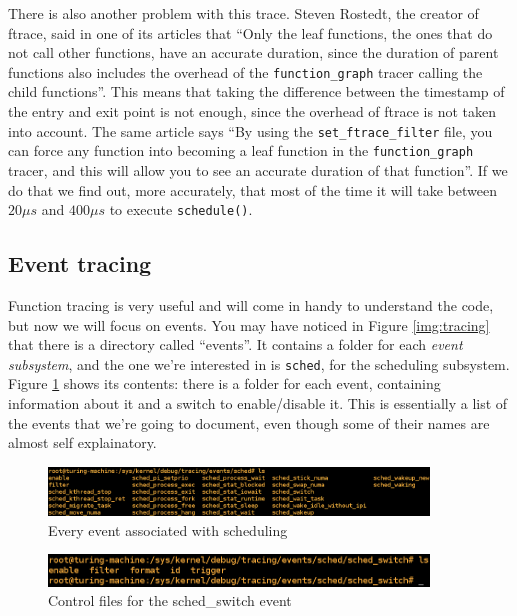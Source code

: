 There is also another problem with this trace. Steven Rostedt, the creator of ftrace, said in one of its articles that ``Only the leaf functions, the ones that do not call other functions, have an accurate duration, since the duration of parent functions also includes the overhead of the \verb|function_graph| tracer calling the child functions''.\cite{secrets} This means that taking the difference between the timestamp of the entry and exit point is not enough, since the overhead of ftrace is not taken into account. The same article says ``By using the \verb|set_ftrace_filter| file, you can force any function into becoming a leaf function in the \verb|function_graph| tracer, and this will allow you to see an accurate duration of that function''. If we do that we find out, more accurately, that most of the time it will take between $20 \mu s$ and $400\mu s$ to execute \verb|schedule()|.

\subsection{Event tracing}
Function tracing is very useful and will come in handy to understand the code, but now we will focus on events. You may have noticed in Figure \ref{img:tracing} that there is a directory called ``events''. It contains a folder for each \textit{event subsystem}, and the one we're interested in is \verb|sched|, for the scheduling subsystem. Figure \ref{img:sched} shows its contents: there is a folder for each event, containing information about it and a switch to enable/disable it. This is essentially a list of the events that we're going to document, even though some of their names are almost self explainatory.

\begin{figure}[ht]
\centering
\includegraphics[width=0.9\textwidth]{images/shell_sched.png}
\caption{Every event associated with scheduling}
\label{img:sched}
\end{figure}

\begin{figure}[ht]
\centering
\includegraphics[width=0.9\textwidth]{images/shell_sched_event.png} 
\caption{Control files for the sched\_switch event}
\label{img:sched_event}
\end{figure}

